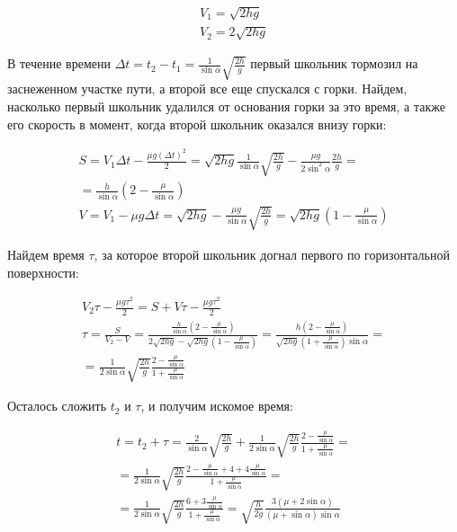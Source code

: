 \documentclass{article}
\begin{document}
\begin{enumerate}
\begin{enumerate}
        \begin{gather*}
            V_1 = \sqrt{2 h g} \\
            V_2 = 2 \sqrt{2 h g}
        \end{gather*}
        
        В течение времени $ \Delta t = t_2 - t_1 = \frac{1}{\sin{\alpha}} \sqrt{\frac{2h}{g}} $ первый школьник тормозил на заснеженном участке пути, а второй все еще спускался с горки. Найдем, насколько первый школьник удалился от основания горки за это время, а также его скорость в момент, когда второй школьник оказался внизу горки:
        
        \begin{gather*}
            S = V_1 \Delta t - \frac{\mu g {(\Delta t)}^2}{2} = \sqrt{2 h g} \frac{1}{\sin{\alpha}} \sqrt{\frac{2h}{g}} - \frac{\mu g}{2\sin^2{\alpha}} \frac{2h}{g} = \\
            = \frac{h}{\sin{\alpha}} \left( 2 - \frac{\mu}{\sin{\alpha}} \right) \\
            V = V_1 - \mu g \Delta t = \sqrt{2 h g} - \frac{\mu g}{\sin{\alpha}} \sqrt{\frac{2h}{g}} = \sqrt{2 h g} \left( 1 - \frac{\mu}{\sin{\alpha}} \right)
        \end{gather*}
        
        Найдем время $ \tau $, за которое второй школьник догнал первого по горизонтальной поверхности:
        
        \begin{gather*}
            V_2 \tau - \frac{\mu g \tau^2}{2} = S + V \tau - \frac{\mu g \tau^2}{2} \\
            \tau = \frac{S}{V_2 - V} = \frac{\frac{h}{\sin{\alpha}} \left( 2 - \frac{\mu}{\sin{\alpha}} \right)}{2 \sqrt{2 h g} - \sqrt{2 h g} \left( 1 - \frac{\mu}{\sin{\alpha}} \right)} = \frac{h \left( 2 - \frac{\mu}{\sin{\alpha}} \right)}{\sqrt{2 h g} \left( 1 + \frac{\mu}{\sin{\alpha}} \right) \sin{\alpha}} = \\
            = \frac{1}{2\sin{\alpha}} \sqrt{\frac{2h}{g}} \frac{2 - \frac{\mu}{\sin{\alpha}}}{1 + \frac{\mu}{\sin{\alpha}}}
        \end{gather*}

        Осталось сложить $ t_2 $ и $ \tau $, и получим искомое время:

        \begin{gather*}
            t = t_2 + \tau = \frac{2}{\sin{\alpha}} \sqrt{\frac{2h}{g}} + \frac{1}{2\sin{\alpha}} \sqrt{\frac{2h}{g}} \frac{2 - \frac{\mu}{\sin{\alpha}}}{1 + \frac{\mu}{\sin{\alpha}}} = \\
            = \frac{1}{2\sin{\alpha}} \sqrt{\frac{2h}{g}} \frac{2 - \frac{\mu}{\sin{\alpha}} + 4 + 4\frac{\mu}{\sin{\alpha}}}{1 + \frac{\mu}{\sin{\alpha}}} = \\
            = \frac{1}{2\sin{\alpha}} \sqrt{\frac{2h}{g}} \frac{6 + 3\frac{\mu}{\sin{\alpha}}}{1 + \frac{\mu}{\sin{\alpha}}} = \sqrt{\frac{h}{2g}} \frac{3\left(\mu + 2\sin{\alpha}\right)}{\left(\mu + \sin{\alpha} \right) \sin{\alpha}}
        \end{gather*}
    \end{enumerate}


\end{enumerate}
\end{document}
